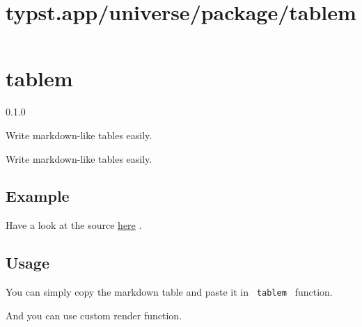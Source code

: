 \title{typst.app/universe/package/tablem}

\label{banner}
\section{tablem}\label{tablem}

{ 0.1.0 }

Write markdown-like tables easily.

\label{readme}
Write markdown-like tables easily.

\subsection{Example}\label{example}

Have a look at the source
\href{https://github.com/typst/packages/raw/main/packages/preview/tablem/0.1.0/examples/example.typ}{here}
.


\subsection{Usage}\label{usage}

You can simply copy the markdown table and paste it in
\texttt{\ tablem\ } function.

\begin{Shaded}
\begin{Highlighting}[]

\NormalTok{\#tablem[}
\NormalTok{  | {-}{-}{-}{-}{-}{-} | {-}{-}{-}{-}{-}{-}{-}{-}{-}{-} | {-}{-}{-}{-}{-}{-}{-}{-} | {-}{-}{-}{-}{-}{-}{-} |}
\NormalTok{]}
\end{Highlighting}
\end{Shaded}

And you can use custom render function.

